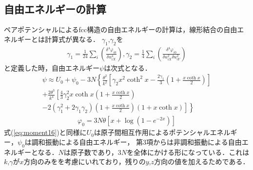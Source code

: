 \subsection{自由エネルギーの計算}
ペアポテンシャルによるfcc構造の自由エネルギーの計算は，線形結合の自由エネルギーとは計算式が異なる．
$\gamma_1$,$\gamma_2$を
\begin{eqnarray}
\label{eq:moment24}
\gamma_1=\frac{1}{24}\sum_i \left( \frac{\delta^4\varphi_{i0}}{\delta u_{iX}^4} \right), 
\gamma_2=\frac{1}{4}\sum_i \left(\frac{\delta^4\varphi_{i0}}{\delta u_{iX}^2\delta u_{iY}^2}\right)
\end{eqnarray}
と定義した時，自由エネルギー$\psi$は次式となる\cite[p.516]{jindo2}．
\begin{align}
\label{eq:moment25}
\psi \approx U_0+\psi_0-
3N\left\{ \frac{\theta^2}{k^2}\left[ \gamma_2x^2 \coth^2 x -\frac{2\gamma_1}{3}\left(1+\frac{x \coth x}{2}\right)\right]\right.\nonumber \\
\left. +\frac{2\theta^3}{k^4}\left[\frac{4}{3}\gamma_2^2 x \coth x \left(1+\frac{x \coth x}{2}\right) \right. \right. \nonumber\\
\left. \left. -2(\gamma_1^2+2\gamma_1\gamma_2)\left(1+\frac{x \coth x}{2}\right)(1+x \coth x)\right]\right\}
\end{align}
\begin{eqnarray}
\label{eq:moment27}
\varphi_0 = 3N\theta[x+\log{(1-e^{-2x})}]
\end{eqnarray}
式(\ref{eq:moment16})と同様に$U_0$は原子間相互作用によるポテンシャルエネルギー，$\psi_0$は調和振動による自由エネルギー，	
第3項からは非調和振動による自由エネルギーとなる．$N$は原子数であり，$3N$を全体にかける形になっている．これは$k$,$\gamma$が$x$方向のみをを考慮にいれており，残りの$y$,$z$方向の値を加えるためである．
